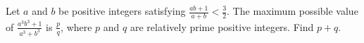 Let $a$ and $b$ be positive integers satisfying $\frac{ab+1}{a+b}<\frac{3}{2}$. The maximum possible value of $\frac{a^3b^3+1}{a^3+b^3}$ is $\frac{p}{q}$, where $p$ and $q$ are relatively prime positive integers. Find $p+q$.